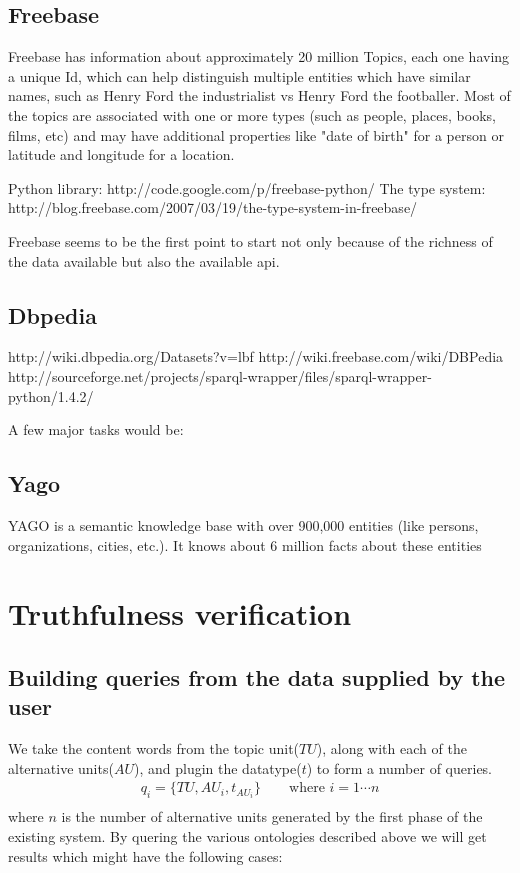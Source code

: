 \documentclass[11pt]{article}
\begin{document}
\subsection{Freebase} 
Freebase has information about approximately 20 million Topics,
each one having a unique Id, which can help distinguish multiple entities which
have similar names, such as Henry Ford the industrialist vs Henry Ford the
footballer. Most of the topics are associated with one or more types (such as
people, places, books, films, etc) and may have additional properties like "date
of birth" for a person or latitude and longitude for a location.


Python library: http://code.google.com/p/freebase-python/ The type system:
http://blog.freebase.com/2007/03/19/the-type-system-in-freebase/

Freebase seems to be the first point to start not only because of
the richness of the data available but also the available api. 




\subsection{Dbpedia}


http://wiki.dbpedia.org/Datasets?v=lbf
http://wiki.freebase.com/wiki/DBPedia
http://sourceforge.net/projects/sparql-wrapper/files/sparql-wrapper-python/1.4.2/ 


A few major tasks would be:

\subsection{Yago}
YAGO is a semantic knowledge base with over 900,000 entities (like persons,
organizations, cities, etc.). It knows about 6 million facts about these entities







\section{Truthfulness verification }
\subsection {Building queries from the data supplied by the user}

We take the content words from the topic unit($TU$), along with each of the
alternative units($AU$), and plugin the datatype($t$) to form a number of
queries.
\begin{align*}
q_{i} = \{{TU, AU_{i}, t_{AU_{i}}} \} \qquad \mbox {where $i = 1 \cdots n$} \\
\end{align*}
where $n$ is the number of alternative units generated by the first phase of
the existing system. By quering the various ontologies described above we will
get results which might have the following cases:
\end{document}
